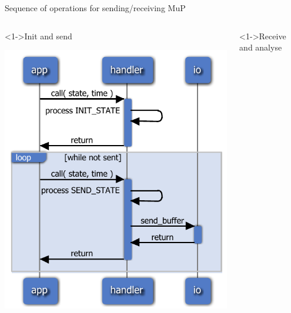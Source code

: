 \documentclass{beamer}
\begin{document}
\begin{frame}{Sequence of operations for sending/receiving MuP}
   \begin{columns}
      \begin{column}{0.5\textwidth}
         \begin{block}<1->{Init and send}
            \centerline{\includegraphics[height=0.5\textheight]{slides/send_recv.pdf}}
         \end{block}
      \end{column}
      \begin{column}{0.5\textwidth}
         \begin{block}<1->{Receive and analyse}

\end{block}
\end{column}
\end{columns}
\end{frame}
\end{document}
